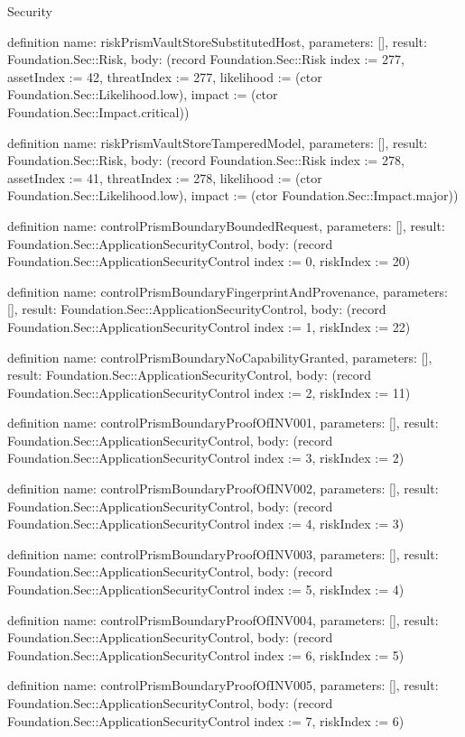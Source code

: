 \begin{lexlean}{Security}
\begin{semanticmodule}
definition{
  name: riskPrismVaultStoreSubstitutedHost,
  parameters: [],
  result: Foundation.Sec::Risk,
  body: (record Foundation.Sec::Risk {index := 277, assetIndex := 42, threatIndex := 277, likelihood := (ctor Foundation.Sec::Likelihood.low), impact := (ctor Foundation.Sec::Impact.critical)})
}

definition{
  name: riskPrismVaultStoreTamperedModel,
  parameters: [],
  result: Foundation.Sec::Risk,
  body: (record Foundation.Sec::Risk {index := 278, assetIndex := 41, threatIndex := 278, likelihood := (ctor Foundation.Sec::Likelihood.low), impact := (ctor Foundation.Sec::Impact.major)})
}

definition{
  name: controlPrismBoundaryBoundedRequest,
  parameters: [],
  result: Foundation.Sec::ApplicationSecurityControl,
  body: (record Foundation.Sec::ApplicationSecurityControl {index := 0, riskIndex := 20})
}

definition{
  name: controlPrismBoundaryFingerprintAndProvenance,
  parameters: [],
  result: Foundation.Sec::ApplicationSecurityControl,
  body: (record Foundation.Sec::ApplicationSecurityControl {index := 1, riskIndex := 22})
}

definition{
  name: controlPrismBoundaryNoCapabilityGranted,
  parameters: [],
  result: Foundation.Sec::ApplicationSecurityControl,
  body: (record Foundation.Sec::ApplicationSecurityControl {index := 2, riskIndex := 11})
}

definition{
  name: controlPrismBoundaryProofOfINV001,
  parameters: [],
  result: Foundation.Sec::ApplicationSecurityControl,
  body: (record Foundation.Sec::ApplicationSecurityControl {index := 3, riskIndex := 2})
}

definition{
  name: controlPrismBoundaryProofOfINV002,
  parameters: [],
  result: Foundation.Sec::ApplicationSecurityControl,
  body: (record Foundation.Sec::ApplicationSecurityControl {index := 4, riskIndex := 3})
}

definition{
  name: controlPrismBoundaryProofOfINV003,
  parameters: [],
  result: Foundation.Sec::ApplicationSecurityControl,
  body: (record Foundation.Sec::ApplicationSecurityControl {index := 5, riskIndex := 4})
}

definition{
  name: controlPrismBoundaryProofOfINV004,
  parameters: [],
  result: Foundation.Sec::ApplicationSecurityControl,
  body: (record Foundation.Sec::ApplicationSecurityControl {index := 6, riskIndex := 5})
}

definition{
  name: controlPrismBoundaryProofOfINV005,
  parameters: [],
  result: Foundation.Sec::ApplicationSecurityControl,
  body: (record Foundation.Sec::ApplicationSecurityControl {index := 7, riskIndex := 6})
}


\end{semanticmodule}
\end{lexlean}
